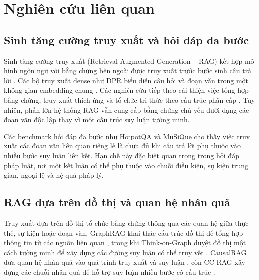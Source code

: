 \section{Nghiên cứu liên quan}
\label{sec:related_work}

\subsection{Sinh tăng cường truy xuất và hỏi đáp đa bước}

Sinh tăng cường truy xuất (Retrieval-Augmented Generation -- RAG) kết hợp mô
hình ngôn ngữ với bằng chứng bên ngoài được truy xuất trước bước sinh câu trả
lời \cite{lewis2020retrieval,gao2024ragsurvey}. Các bộ truy xuất dense như DPR
biểu diễn câu hỏi và đoạn văn trong một không gian embedding chung
\cite{karpukhin2020dense}. Các nghiên cứu tiếp theo cải thiện việc tổng hợp
bằng chứng, truy xuất thích ứng và tổ chức tri thức theo cấu trúc phân cấp
\cite{izacard2021fid,asai2024selfrag,sarthi2024raptor}. Tuy nhiên, phần lớn hệ
thống RAG vẫn cung cấp bằng chứng chủ yếu dưới dạng các đoạn văn độc lập thay vì
một cấu trúc suy luận tường minh.

Các benchmark hỏi đáp đa bước như HotpotQA \cite{yang2018hotpotqa} và MuSiQue
\cite{trivedi2022musique} cho thấy việc truy xuất các đoạn văn liên quan riêng
lẻ là chưa đủ khi câu trả lời phụ thuộc vào nhiều bước suy luận liên kết. Hạn
chế này đặc biệt quan trọng trong hỏi đáp pháp luật, nơi một kết luận có thể phụ
thuộc vào chuỗi điều kiện, sự kiện trung gian, ngoại lệ và hệ quả pháp lý.

\subsection{RAG dựa trên đồ thị và quan hệ nhân quả}

Truy xuất dựa trên đồ thị tổ chức bằng chứng thông qua các quan hệ giữa thực
thể, sự kiện hoặc đoạn văn. GraphRAG khai thác cấu trúc đồ thị để tổng hợp thông
tin từ các nguồn liên quan \cite{edge2024graphrag}, trong khi Think-on-Graph
duyệt đồ thị một cách tường minh để xây dựng các đường suy luận có thể truy vết
\cite{sun2024thinkongraph}. CausalRAG đưa quan hệ nhân quả vào quá trình truy
xuất và suy luận \cite{wang2025causalrag}, còn CC-RAG xây dựng các chuỗi nhân
quả để hỗ trợ suy luận nhiều bước có cấu trúc \cite{parekh2025ccrag}.

